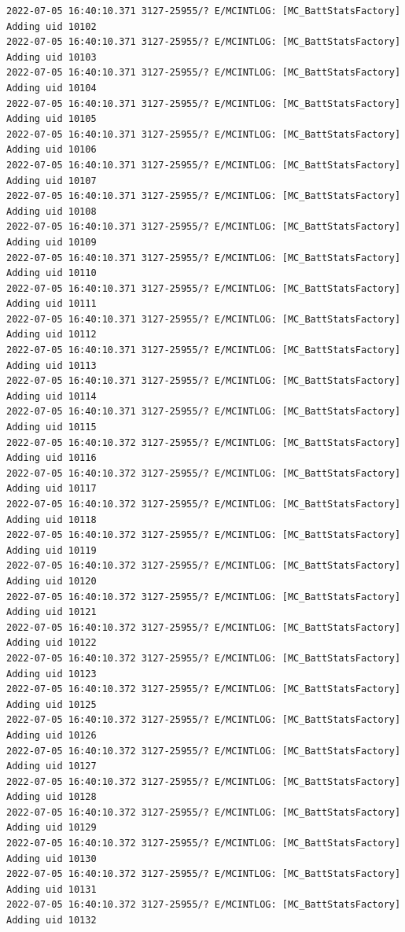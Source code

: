 \documentclass[a4paper,12pt]{book}
\begin{document}
\begin{lstlisting}
2022-07-05 16:40:10.371 3127-25955/? E/MCINTLOG: [MC_BattStatsFactory] Adding uid 10102
2022-07-05 16:40:10.371 3127-25955/? E/MCINTLOG: [MC_BattStatsFactory] Adding uid 10103
2022-07-05 16:40:10.371 3127-25955/? E/MCINTLOG: [MC_BattStatsFactory] Adding uid 10104
2022-07-05 16:40:10.371 3127-25955/? E/MCINTLOG: [MC_BattStatsFactory] Adding uid 10105
2022-07-05 16:40:10.371 3127-25955/? E/MCINTLOG: [MC_BattStatsFactory] Adding uid 10106
2022-07-05 16:40:10.371 3127-25955/? E/MCINTLOG: [MC_BattStatsFactory] Adding uid 10107
2022-07-05 16:40:10.371 3127-25955/? E/MCINTLOG: [MC_BattStatsFactory] Adding uid 10108
2022-07-05 16:40:10.371 3127-25955/? E/MCINTLOG: [MC_BattStatsFactory] Adding uid 10109
2022-07-05 16:40:10.371 3127-25955/? E/MCINTLOG: [MC_BattStatsFactory] Adding uid 10110
2022-07-05 16:40:10.371 3127-25955/? E/MCINTLOG: [MC_BattStatsFactory] Adding uid 10111
2022-07-05 16:40:10.371 3127-25955/? E/MCINTLOG: [MC_BattStatsFactory] Adding uid 10112
2022-07-05 16:40:10.371 3127-25955/? E/MCINTLOG: [MC_BattStatsFactory] Adding uid 10113
2022-07-05 16:40:10.371 3127-25955/? E/MCINTLOG: [MC_BattStatsFactory] Adding uid 10114
2022-07-05 16:40:10.371 3127-25955/? E/MCINTLOG: [MC_BattStatsFactory] Adding uid 10115
2022-07-05 16:40:10.372 3127-25955/? E/MCINTLOG: [MC_BattStatsFactory] Adding uid 10116
2022-07-05 16:40:10.372 3127-25955/? E/MCINTLOG: [MC_BattStatsFactory] Adding uid 10117
2022-07-05 16:40:10.372 3127-25955/? E/MCINTLOG: [MC_BattStatsFactory] Adding uid 10118
2022-07-05 16:40:10.372 3127-25955/? E/MCINTLOG: [MC_BattStatsFactory] Adding uid 10119
2022-07-05 16:40:10.372 3127-25955/? E/MCINTLOG: [MC_BattStatsFactory] Adding uid 10120
2022-07-05 16:40:10.372 3127-25955/? E/MCINTLOG: [MC_BattStatsFactory] Adding uid 10121
2022-07-05 16:40:10.372 3127-25955/? E/MCINTLOG: [MC_BattStatsFactory] Adding uid 10122
2022-07-05 16:40:10.372 3127-25955/? E/MCINTLOG: [MC_BattStatsFactory] Adding uid 10123
2022-07-05 16:40:10.372 3127-25955/? E/MCINTLOG: [MC_BattStatsFactory] Adding uid 10125
2022-07-05 16:40:10.372 3127-25955/? E/MCINTLOG: [MC_BattStatsFactory] Adding uid 10126
2022-07-05 16:40:10.372 3127-25955/? E/MCINTLOG: [MC_BattStatsFactory] Adding uid 10127
2022-07-05 16:40:10.372 3127-25955/? E/MCINTLOG: [MC_BattStatsFactory] Adding uid 10128
2022-07-05 16:40:10.372 3127-25955/? E/MCINTLOG: [MC_BattStatsFactory] Adding uid 10129
2022-07-05 16:40:10.372 3127-25955/? E/MCINTLOG: [MC_BattStatsFactory] Adding uid 10130
2022-07-05 16:40:10.372 3127-25955/? E/MCINTLOG: [MC_BattStatsFactory] Adding uid 10131
2022-07-05 16:40:10.372 3127-25955/? E/MCINTLOG: [MC_BattStatsFactory] Adding uid 10132

\end{lstlisting}
\end{document}
